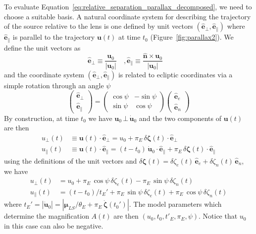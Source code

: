 \documentclass[12pt]{report}
\begin{document}
To evaluate Equation~\ref{eq:relative_separation_parallax_decomposed}, we need
to choose a suitable basis. A natural coordinate system for describing the
trajectory of the source relative to the lens is one defined by unit vectors
$(\mathbf{\hat e}_\bot,\mathbf{\hat e}_\parallel)$ where $\mathbf{\hat e}_\parallel$ is parallel to the trajectory $\mathbf{u}(t)$ at time $t_0$
(Figure~\ref{fig:parallax2}). We define the unit vectors as
\begin{equation}
    \mathbf{\hat e}_\bot\equiv \frac{\mathbf{u}_0}{|\mathbf{u}_0|}\quad,
    \mathbf{\hat e}_\parallel\equiv \frac{\mathbf{\hat n}\times\mathbf{u}_0}{|\mathbf{u}_0|}\quad
\end{equation}
and the coordinate system $(\mathbf{\hat e}_\bot,\mathbf{\hat e}_\parallel)$ is related to ecliptic coordinates via a simple rotation through an
angle $\psi$
\begin{equation}
    \begin{pmatrix}
        \mathbf{\hat e}_\bot \\
        \mathbf{\hat e}_\parallel
    \end{pmatrix}
    =
    \begin{pmatrix}
        \cos\psi & -\sin\psi \\
        \sin\psi & \cos\psi
    \end{pmatrix}
    \begin{pmatrix}
        \mathbf{\hat e}_e \\
        \mathbf{\hat e}_n
    \end{pmatrix}
    \label{eq:ecliptic_to_parallel}
\end{equation}
By construction, at time $t_0$ we have
$\mathbf{u}_0\,\bot\,\dot{\mathbf{u}}_0$ and the two components of
$\mathbf{u}(t)$ are then
\begin{align}
    u_\bot(t)      & \equiv \mathbf{u}(t)\cdot \mathbf{\hat e}_\bot= u_0 +
    \pi_E\,\delta\boldsymbol \zeta(t)\cdot\mathbf{\hat e}_\bot                                                                                                                                       \\
    u_\parallel(t) & \equiv \mathbf{u}(t)\cdot \mathbf{\hat e}_\parallel= (t-t_0)\,\dot{\mathbf{u}}_0\cdot\mathbf{\hat e}_\parallel+ \pi_E\,\delta\boldsymbol \zeta(t)\cdot\mathbf{\hat e}_\parallel
\end{align}
using the definitions of the unit vectors and
$\delta\boldsymbol \zeta(t)=
    \delta \zeta_e(t)\,\mathbf{\hat e}_e+\delta \zeta_n(t)\,\mathbf{\hat e}_n$, we have
\begin{align}
    u_\bot(t)      & = u_0 + \pi_E\,\cos\psi\,\delta \zeta_e(t) - \pi_E\,\sin\psi\,\delta \zeta_n(t)
    \label{eq:u_t_parallel1}                                                                         \\
    u_\parallel(t) & =(t-t_0)/t_E' + \pi_E\,\sin\psi\,\delta \zeta_e(t) +
    \pi_E\,\cos\psi\,\delta \zeta_n(t) \label{eq:u_t_parallel2}
\end{align}
where $t_E' =|\dot{\mathbf{u}}_0|=|\boldsymbol\mu_{LS}/\theta_E  + \pi_E\,\dot{\boldsymbol \zeta}(t_0')|$.
The model parameters which determine the magnification $A(t)$ are then
$\left(u_0,t_0,t'_E,\pi_E,\psi\right)$. Notice that $u_0$ in this case can also be negative.
\end{document}
